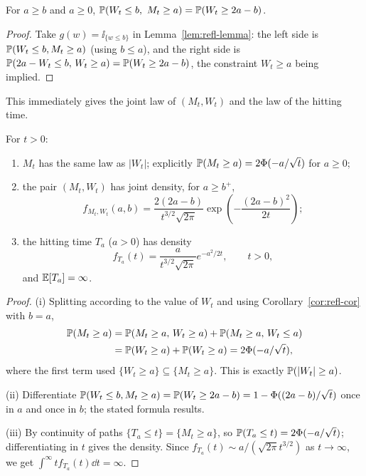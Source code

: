 \documentclass[a4paper]{scrartcl}
\begin{document}
\begin{corollary}\label{cor:refl-cor}
	For $a\geq b$ and $a\geq0$, $\mathbb{P}(W_t\leq b,\ M_t\geq a) = \mathbb{P}(W_t \geq 2a-b)$.
\end{corollary}

\begin{proof}
	Take $g(w) = \ii_{\{w\leq b\}}$ in Lemma~\ref{lem:refl-lemma}: the left side is $\mathbb{P}(W_t\leq b, M_t\geq a)$ (using $b \leq a$), and the right side is $\mathbb{P}(2a-W_t \leq b,\, W_t \geq a) = \mathbb{P}(W_t\geq 2a-b)$, the constraint $W_t\geq a$ being implied.
\end{proof}

This immediately gives the joint law of $(M_t, W_t)$ and the law of the hitting time.

\begin{theorem}\label{thm:max-law}
	For $t>0$:
	\begin{enumerate}[label=(\roman*)]
		\item $M_t$ has the same law as $|W_t|$; explicitly $\mathbb{P}(M_t\geq a) = 2\Phi(-a/\sqrt t)$ for $a\geq0$;
		\item the pair $(M_t,W_t)$ has joint density, for $a\geq b^+$,
		$$
		f_{M_t,W_t}(a,b) = \frac{2(2a-b)}{t^{3/2}\sqrt{2\pi}}\exp\left(-\frac{(2a-b)^2}{2t}\right);
		$$
		\item the hitting time $T_a$ ($a>0$) has density
		$$
		f_{T_a}(t) = \frac{a}{t^{3/2}\sqrt{2\pi}}e^{-a^2/2t}, \qquad t>0,
		$$
		and $\mathbb{E}[T_a] = \infty$.
	\end{enumerate}
\end{theorem}

\begin{proof}
	(i) Splitting according to the value of $W_t$ and using Corollary~\ref{cor:refl-cor} with $b=a$,
	\begin{align*}
		\mathbb{P}(M_t\geq a) &= \mathbb{P}(M_t\geq a,\, W_t\geq a) + \mathbb{P}(M_t \geq a,\, W_t\leq a)\\
		&= \mathbb{P}(W_t\geq a) + \mathbb{P}(W_t\geq a) = 2\Phi(-a/\sqrt t),
	\end{align*}
	where the first term used $\{W_t\geq a\}\subseteq\{M_t\geq a\}$. This is exactly $\mathbb{P}(|W_t| \geq a)$.

	(ii) Differentiate $\mathbb{P}(W_t\leq b, M_t\geq a) = \mathbb{P}(W_t\geq 2a-b) = 1 - \Phi((2a-b)/\sqrt t)$ once in $a$ and once in $b$; the stated formula results.

	(iii) By continuity of paths $\{T_a\leq t\} = \{M_t\geq a\}$, so $\mathbb{P}(T_a\leq t) = 2\Phi(-a/\sqrt t)$; differentiating in $t$ gives the density. Since $f_{T_a}(t)\sim a/(\sqrt{2\pi}t^{3/2})$ as $t\to\infty$, we get $\int^\infty t f_{T_a}(t)\dd t = \infty$.
\end{proof}
\end{document}
